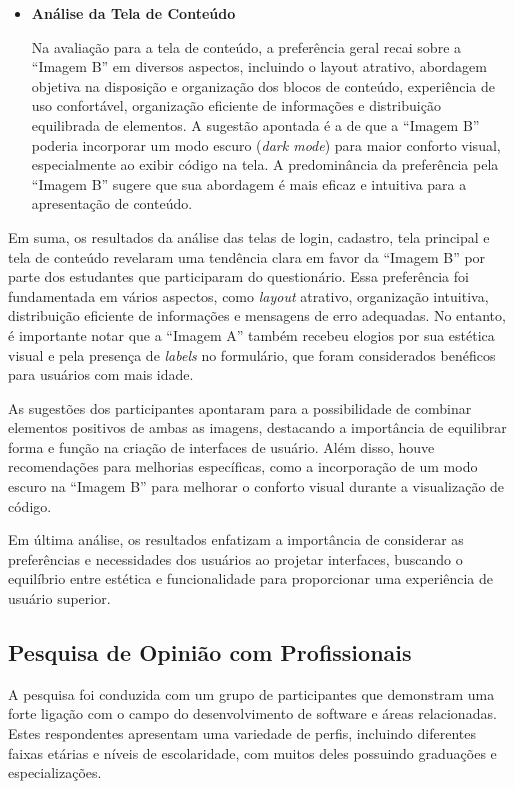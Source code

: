 \begin{itemize}
    \item \textbf{Análise da Tela de Conteúdo}
    
    Na avaliação para a tela de conteúdo, a preferência geral recai sobre a ``Imagem B'' em diversos aspectos, incluindo o layout atrativo, abordagem objetiva na disposição e organização dos blocos de conteúdo, experiência de uso confortável, organização eficiente de informações e distribuição equilibrada de elementos. A sugestão apontada é a de que a ``Imagem B'' poderia incorporar um modo escuro (\textit{dark mode}) para maior conforto visual, especialmente ao exibir código na tela. A predominância da preferência pela ``Imagem B'' sugere que sua abordagem é mais eficaz e intuitiva para a apresentação de conteúdo.
\end{itemize}

Em suma, os resultados da análise das telas de login, cadastro, tela principal e tela de conteúdo revelaram uma tendência clara em favor da ``Imagem B'' por parte dos estudantes que participaram do questionário. Essa preferência foi fundamentada em vários aspectos, como \textit{layout} atrativo, organização intuitiva, distribuição eficiente de informações e mensagens de erro adequadas. No entanto, é importante notar que a ``Imagem A'' também recebeu elogios por sua estética visual e pela presença de \textit{labels} no formulário, que foram considerados benéficos para usuários com mais idade.

As sugestões dos participantes apontaram para a possibilidade de combinar elementos positivos de ambas as imagens, destacando a importância de equilibrar forma e função na criação de interfaces de usuário. Além disso, houve recomendações para melhorias específicas, como a incorporação de um modo escuro na ``Imagem B'' para melhorar o conforto visual durante a visualização de código.

Em última análise, os resultados enfatizam a importância de considerar as preferências e necessidades dos usuários ao projetar interfaces, buscando o equilíbrio entre estética e funcionalidade para proporcionar uma experiência de usuário superior.


\subsection{Pesquisa de Opinião com Profissionais}
\label{Pesquisa_de_Opinião_com_Profissionais}

A pesquisa foi conduzida com um grupo de participantes que demonstram uma forte ligação com o campo do desenvolvimento de software e áreas relacionadas. Estes respondentes apresentam uma variedade de perfis, incluindo diferentes faixas etárias e níveis de escolaridade, com muitos deles possuindo graduações e especializações.

